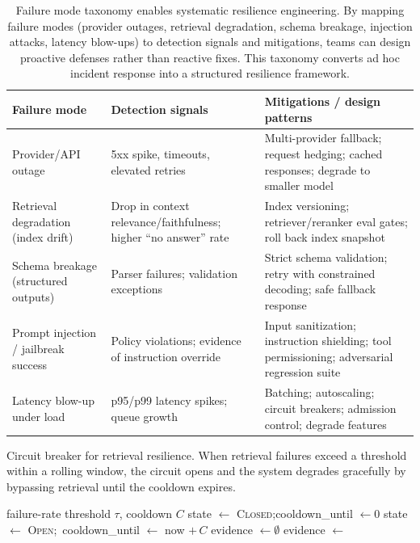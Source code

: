 \begin{table}[t]
\centering
\caption{Failure mode taxonomy enables systematic resilience engineering. By mapping failure modes (provider outages, retrieval degradation, schema breakage, injection attacks, latency blow-ups) to detection signals and mitigations, teams can design proactive defenses rather than reactive fixes. This taxonomy converts ad hoc incident response into a structured resilience framework.}
\label{tab:ch10_failure_modes}
\small
\setlength{\tabcolsep}{6pt}
\renewcommand{\arraystretch}{1.3}
\begin{tabularx}{\linewidth}{@{}p{3.2cm}X X@{}}
\toprule
\rowcolor{gray!15}
\textbf{Failure mode} & \textbf{Detection signals} & \textbf{Mitigations / design patterns} \\
\midrule
Provider/API outage &
5xx spike, timeouts, elevated retries &
Multi-provider fallback; request hedging; cached responses; degrade to smaller model \\
\midrule
Retrieval degradation (index drift) &
Drop in context relevance/faithfulness; higher ``no answer'' rate &
Index versioning; retriever/reranker eval gates; roll back index snapshot \\
\midrule
Schema breakage (structured outputs) &
Parser failures; validation exceptions &
Strict schema validation; retry with constrained decoding; safe fallback response \\
\midrule
Prompt injection / jailbreak success &
Policy violations; evidence of instruction override &
Input sanitization; instruction shielding; tool permissioning; adversarial regression suite \\
\midrule
Latency blow-up under load &
p95/p99 latency spikes; queue growth &
Batching; autoscaling; circuit breakers; admission control; degrade features \\
\bottomrule
\end{tabularx}
\end{table}

\begin{llmalgobox}{Circuit breaker for retrieval resilience. When retrieval failures exceed a threshold within a rolling window, the circuit opens and the system degrades gracefully by bypassing retrieval until the cooldown expires.}
\label{alg:ch10_circuit_breaker}
\begin{algorithmic}[1]
  \Require failure-rate threshold $\tau$, cooldown $C$
  \State state $\gets$ \textsc{Closed};\quad cooldown\_until $\gets 0$
    \State state $\gets$ \textsc{Open};\ cooldown\_until $\gets$ now $+\,C$
  \EndIf
    \State evidence $\gets \emptyset$ 
  \Else
    \State evidence $\gets$  
  \EndIf
\end{algorithmic}
\end{llmalgobox}

